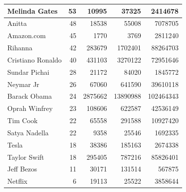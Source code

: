 \documentclass[oneside,openright,12pt]{ufsm_2015} %
\begin{document}
\begin{table}[ht]
\begin{tabular}{|l|r|r|r|r|}
    Melinda Gates		& 53	& 10995		& 37325		& 2414678 	\\ \hline
    Anitta				& 48	& 18538		& 55008		& 7078705 	\\ \hline
    Amazon.com			& 45	& 1770		& 3769		& 2811240 	\\ \hline
    Rihanna				& 42	& 283679	& 1702401	& 88264703 	\\ \hline
    Cristiano Ronaldo	& 40	& 431103	& 3270122	& 72951646 	\\ \hline
    Sundar Pichai		& 28	& 21172		& 84020		& 1845772 	\\ \hline
    Neymar Jr			& 26	& 67060		& 641590	& 39610118 	\\ \hline
    Barack Obama		& 24	& 2875662	& 13890988	& 102464343 \\ \hline
    Oprah Winfrey		& 23	& 108606	& 622587	& 42536149 	\\ \hline
    Tim Cook			& 22	& 65558		& 291588	& 10927420 	\\ \hline
    Satya Nadella		& 22	& 9358		& 25546		& 1692335 	\\ \hline
    Tesla				& 18	& 38386		& 185163	& 2674338 	\\ \hline
    Taylor Swift		& 18	& 295405	& 787216	& 85826401 	\\ \hline
    Jeff Bezos			& 11	& 30171		& 131514	& 567875 	\\ \hline
    Netflix				& 6		& 19113		& 25522		& 3858644 	\\ \hline
    \end{tabular}
    \end{table}
\end{document}
